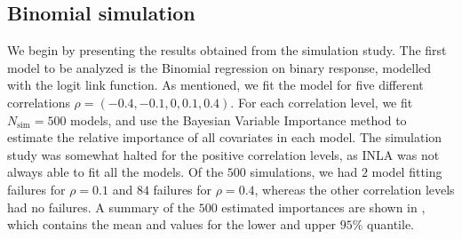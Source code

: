 \subsection{Binomial simulation}
We begin by presenting the results obtained from the simulation study. The first model to be analyzed is the Binomial regression on binary response, modelled with the logit link function. As mentioned, we fit the model for five different correlations $\rho=(-0.4, -0.1, 0, 0.1, 0.4)$. For each correlation level, we fit $N_{\text{sim}}=500$ models, and use the Bayesian Variable Importance method to estimate the relative importance of all covariates in each model. The simulation study was somewhat halted for the positive correlation levels, as INLA was not always able to fit all the models. Of the $500$ simulations, we had $2$ model fitting failures for $\rho=0.1$ and $84$ failures for $\rho=0.4$, whereas the other correlation levels had no failures. A summary of the $500$ estimated importances are shown in , which contains the mean and values for the lower and upper $95\%$ quantile.
\\
\\ 

